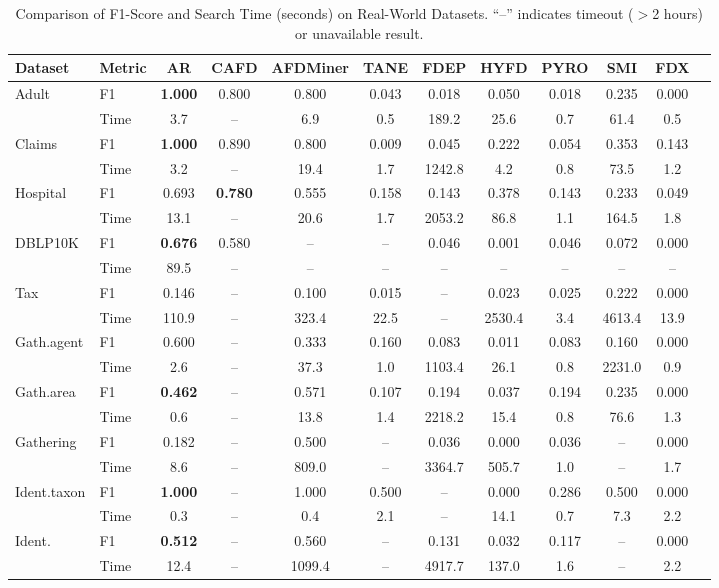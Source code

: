 \documentclass[conference]{IEEEtran}
\begin{document}
\begin{table}[t]
\caption{Comparison of F1-Score and Search Time (seconds) on Real-World Datasets. ``--'' indicates timeout ($>$2 hours) or unavailable result.}
\label{tab:main_results}
\centering
\scriptsize
\begin{tabular}{ll*{10}{c}}
\toprule
\textbf{Dataset} & \textbf{Metric} & \textbf{AR} & \textbf{CAFD} & \textbf{AFDMiner} & \textbf{TANE} & \textbf{FDEP} & \textbf{HYFD} & \textbf{PYRO} & \textbf{SMI} & \textbf{FDX} \\
\midrule
\multirow{2}{*}{Adult} & F1 & \textbf{1.000} & 0.800 & 0.800 & 0.043 & 0.018 & 0.050 & 0.018 & 0.235 & 0.000 \\
& Time & 3.7 & -- & 6.9 & 0.5 & 189.2 & 25.6 & 0.7 & 61.4 & 0.5 \\
\midrule
\multirow{2}{*}{Claims} & F1 & \textbf{1.000} & 0.890 & 0.800 & 0.009 & 0.045 & 0.222 & 0.054 & 0.353 & 0.143 \\
& Time & 3.2 & -- & 19.4 & 1.7 & 1242.8 & 4.2 & 0.8 & 73.5 & 1.2 \\
\midrule
\multirow{2}{*}{Hospital} & F1 & 0.693 & \textbf{0.780} & 0.555 & 0.158 & 0.143 & 0.378 & 0.143 & 0.233 & 0.049 \\
& Time & 13.1 & -- & 20.6 & 1.7 & 2053.2 & 86.8 & 1.1 & 164.5 & 1.8 \\
\midrule
\multirow{2}{*}{DBLP10K} & F1 & \textbf{0.676} & 0.580 & -- & -- & 0.046 & 0.001 & 0.046 & 0.072 & 0.000 \\
& Time & 89.5 & -- & -- & -- & -- & -- & -- & -- & -- \\
\midrule
\multirow{2}{*}{Tax} & F1 & 0.146 & -- & 0.100 & 0.015 & -- & 0.023 & 0.025 & 0.222 & 0.000 \\
& Time & 110.9 & -- & 323.4 & 22.5 & -- & 2530.4 & 3.4 & 4613.4 & 13.9 \\
\midrule
\multirow{2}{*}{Gath.agent} & F1 & 0.600 & -- & 0.333 & 0.160 & 0.083 & 0.011 & 0.083 & 0.160 & 0.000 \\
& Time & 2.6 & -- & 37.3 & 1.0 & 1103.4 & 26.1 & 0.8 & 2231.0 & 0.9 \\
\midrule
\multirow{2}{*}{Gath.area} & F1 & \textbf{0.462} & -- & 0.571 & 0.107 & 0.194 & 0.037 & 0.194 & 0.235 & 0.000 \\
& Time & 0.6 & -- & 13.8 & 1.4 & 2218.2 & 15.4 & 0.8 & 76.6 & 1.3 \\
\midrule
\multirow{2}{*}{Gathering} & F1 & 0.182 & -- & 0.500 & -- & 0.036 & 0.000 & 0.036 & -- & 0.000 \\
& Time & 8.6 & -- & 809.0 & -- & 3364.7 & 505.7 & 1.0 & -- & 1.7 \\
\midrule
\multirow{2}{*}{Ident.taxon} & F1 & \textbf{1.000} & -- & 1.000 & 0.500 & -- & 0.000 & 0.286 & 0.500 & 0.000 \\
& Time & 0.3 & -- & 0.4 & 2.1 & -- & 14.1 & 0.7 & 7.3 & 2.2 \\
\midrule
\multirow{2}{*}{Ident.} & F1 & \textbf{0.512} & -- & 0.560 & -- & 0.131 & 0.032 & 0.117 & -- & 0.000 \\
& Time & 12.4 & -- & 1099.4 & -- & 4917.7 & 137.0 & 1.6 & -- & 2.2 \\
\bottomrule
\end{tabular}
\end{table}
\end{document}
